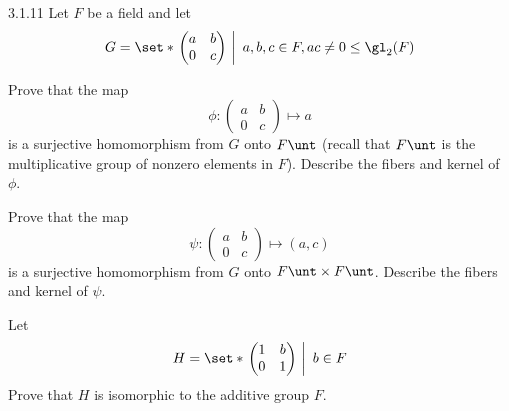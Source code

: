 \begin{exercise}{3.1.11}
    Let $F$ be a field and let
    \[
    	G = \set*{\left.
        \begin{pmatrix}
            a & b \\
            0 & c 
        \end{pmatrix}~\right|~a, b, c \in F, ac \neq 0} \leq \gl_2(F)
	\]
    \begin{subexercises}
        \item Prove that the map
        \[
        	\phi \colon 
            \begin{pmatrix}
                a & b \\
                0 & c
            \end{pmatrix} \mapsto a
	    \]
        is a surjective homomorphism from $G$ onto $F\unt$ (recall that $F\unt$ is the multiplicative group of nonzero elements in $F$).
	    Describe the fibers and kernel of $\phi$.
        \item Prove that the map
        \[
        	\psi \colon 
            \begin{pmatrix}
                a & b \\
                0 & c
            \end{pmatrix} \mapsto (a, c)
        \]
        is a surjective homomorphism from $G$ onto $F\unt \times F\unt$.
	    Describe the fibers and kernel of $\psi$. 
        \item Let
        \[
        	H = \set*{\left .
            \begin{pmatrix}
                1 & b \\
                0 & 1
            \end{pmatrix} ~\right\vert~b \in F}
        \]
        Prove that $H$ is isomorphic to the additive group $F$.
    \end{subexercises}
\end{exercise}

